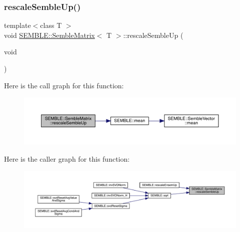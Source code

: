 \mbox{\label{structSEMBLE_1_1SembleMatrix_a7015574fba80f7dbabb0501567c5b58c}} 
\subsubsection{\texorpdfstring{rescaleSembleUp()}{rescaleSembleUp()}\hspace{0.1cm}{\footnotesize\ttfamily [1/2]}}
{\footnotesize\ttfamily template$<$class T $>$ \\
void \mbox{\hyperlink{structSEMBLE_1_1SembleMatrix}{S\+E\+M\+B\+L\+E\+::\+Semble\+Matrix}}$<$ T $>$\+::rescale\+Semble\+Up (\begin{DoxyParamCaption}\item[{void}]{ }\end{DoxyParamCaption})}

Here is the call graph for this function\+:
\nopagebreak
\begin{figure}[H]
\begin{center}
\leavevmode
\includegraphics[width=350pt]{df/d87/structSEMBLE_1_1SembleMatrix_a7015574fba80f7dbabb0501567c5b58c_cgraph}
\end{center}
\end{figure}
Here is the caller graph for this function\+:
\nopagebreak
\begin{figure}[H]
\begin{center}
\leavevmode
\includegraphics[width=350pt]{df/d87/structSEMBLE_1_1SembleMatrix_a7015574fba80f7dbabb0501567c5b58c_icgraph}
\end{center}
\end{figure}
\mbox{\label{structSEMBLE_1_1SembleMatrix_a7015574fba80f7dbabb0501567c5b58c}} 
